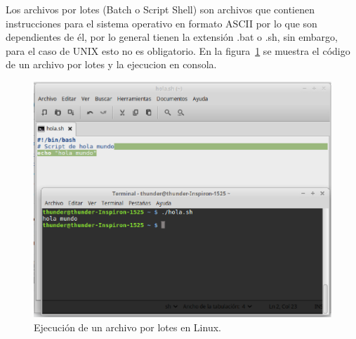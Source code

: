 

Los archivos por lotes (Batch o Script Shell) \cite{Silberschatz1999} son
 archivos que contienen instrucciones para el sistema operativo en formato
 ASCII por lo que son dependientes de \'el, por lo general tienen la extensi\'on
 .bat o .sh, sin embargo, para el caso de UNIX esto no es obligatorio. En la
 figura~\ref{fig:script} se muestra el c\'odigo de un archivo por lotes y la 
 ejecucion en consola.



\begin{figure}[h]
\centering
\includegraphics[width=0.7\columnwidth]{chap2/Imagenes/Script.eps}
\caption{Ejecuci\'on de un archivo por lotes en Linux.}
\label{fig:script}
\end{figure}